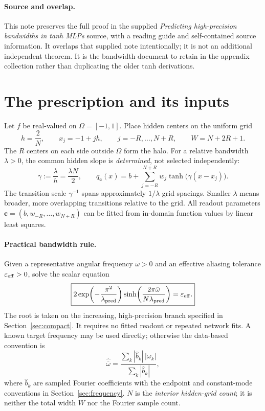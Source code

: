 \documentclass[11pt]{article}
\theoremstyle{definition}\newtheorem{definition}[theorem]{Definition}
\theoremstyle{remark}\newtheorem{remark}[theorem]{Remark}
\numberwithin{equation}{section}
\begin{document}
\paragraph{Source and overlap.}
This note preserves the full proof in the supplied \emph{Predicting high-precision bandwidths in tanh MLPs} source, with a reading guide and self-contained source information. It overlaps that supplied note intentionally; it is not an additional independent theorem. It is the bandwidth document to retain in the appendix collection rather than duplicating the older tanh derivations.

\section{The prescription and its inputs}
\label{sec:setup}
Let $f$ be real-valued on $\Omega=[-1,1]$. Place hidden centers on the uniform grid
\begin{equation}
 h=\frac2N,\qquad x_j=-1+jh,\qquad j=-R,\ldots,N+R,
 \qquad W=N+2R+1.
 \label{eq:geometry}
\end{equation}
The $R$ centers on each side outside $\Omega$ form the halo. For a relative bandwidth $\lambda>0$, the common hidden slope is \emph{determined}, not selected independently:
\begin{equation}
 \gamma:=\frac{\lambda}{h}=\frac{\lambda N}{2},\qquad
 q_{\mathbf c}(x)=b+\sum_{j=-R}^{N+R}w_j\tanh\bigl(\gamma(x-x_j)\bigr).
 \label{eq:mlp}
\end{equation}
The transition scale $\gamma^{-1}$ spans approximately $1/\lambda$ grid spacings. Smaller $\lambda$ means broader, more overlapping transitions relative to the grid. All readout parameters $\mathbf c=(b,w_{-R},\ldots,w_{N+R})$ can be fitted from in-domain function values by linear least squares.

\paragraph{Practical bandwidth rule.}
Given a representative angular frequency $\bar\omega>0$ and an effective aliasing tolerance $\varepsilon_{\rm eff}>0$, solve the scalar equation
\begin{equation}
 \boxed{2\exp\!\left(-\frac{\pi^2}{\lambda_{\rm pred}}\right)
 \sinh\!\left(\frac{2\pi\bar\omega}{N\lambda_{\rm pred}}\right)
 =\varepsilon_{\rm eff}.}
 \label{eq:recipe}
\end{equation}
The root is taken on the increasing, high-precision branch specified in Section~\ref{sec:compact}. It requires no fitted readout or repeated network fits. A known target frequency may be used directly; otherwise the data-based convention is
\begin{equation}
 \widehat{\bar\omega}
 =\frac{\sum_k|\widehat b_k|\,|\omega_k|}{\sum_k|\widehat b_k|},
 \label{eq:centroid-summary}
\end{equation}
where $\widehat b_k$ are sampled Fourier coefficients with the endpoint and constant-mode conventions in Section~\ref{sec:frequency}. $N$ is the \emph{interior hidden-grid count}; it is neither the total width $W$ nor the Fourier sample count.
\end{document}
